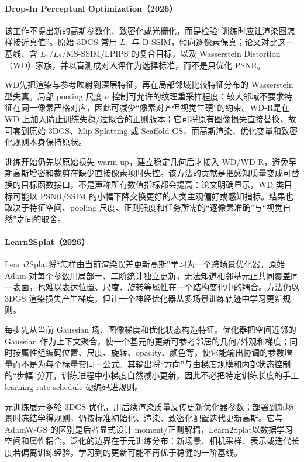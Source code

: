 \paragraph{Drop-In Perceptual Optimization（2026）\cite{2603_23297}}
该工作不提出新的高斯参数化、致密化或光栅化，而是检验“训练时应让渲染图怎样接近真值”。原始 3DGS 常用 $L_1$ 与 D-SSIM，倾向逐像素保真；论文对比这一基线、含 $L_1/L_2/$MS-SSIM/LPIPS 的复合目标，以及 Wasserstein Distortion（WD）家族，并以盲测成对人评作为选择标准，而不是只优化 PSNR。

WD先把渲染与参考映射到深层特征，再在局部邻域比较特征分布的 Wasserstein 型失真。局部 pooling 尺度 $\sigma$ 控制可允许的纹理重采样程度：较大邻域不要求特征在同一像素严格对应，因此可减少“像素对齐但视觉生硬”的约束。WD-R是在 WD 上加入防止训练失稳/过拟合的正则版本；它可将原有图像损失直接替换，故可套到原始 3DGS、Mip-Splatting 或 Scaffold-GS，而高斯渲染、优化变量和致密化规则本身保持原状。

训练开始仍先以原始损失 warm-up，建立稳定几何后才接入 WD/WD-R，避免早期高斯增密和裁剪在缺少直接像素项时失控。该方法的贡献是把感知质量变成可替换的目标函数接口，不是声称所有数值指标都会提高：论文明确显示，WD 类目标可能以 PSNR/SSIM 的小幅下降交换更好的人类主观偏好或感知指标。结果也取决于特征空间、pooling 尺度、正则强度和任务所需的“逐像素准确”与“视觉自然”之间的取舍。

\paragraph{Learn2Splat（2026）\cite{2605_15760}}
Learn2Splat将“怎样由当前渲染误差更新高斯”学习为一个跨场景优化器。原始 Adam 对每个参数用局部一、二阶统计独立更新，无法知道相邻基元正共同覆盖同一表面，也难以表达位置、尺度、旋转等属性在一个结构变化中的耦合。方法仍以 3DGS 渲染损失产生梯度，但让一个神经优化器从多场景训练轨迹中学习更新规则。

每步先从当前 Gaussian 场、图像梯度和优化状态构造特征。优化器把空间近邻的 Gaussian 作为上下文聚合，使一个基元的更新可参考邻居的几何/外观和梯度；同时按属性组编码位置、尺度、旋转、opacity、颜色等，使它能输出协调的参数增量而不是为每个标量套同一公式。其输出将“方向”与由梯度规模和内部状态控制的“步幅”分开，训练进程中小梯度自然减小更新，因此不必把特定训练长度的手工 learning-rate schedule 硬编码进规则。

元训练展开多轮 3DGS 优化，用后续渲染质量反传更新优化器参数；部署到新场景时冻结学得规则，仍按标准初始化、渲染、致密化配置迭代更新高斯。它与 AdamW-GS 的区别是后者显式设计 moment/正则解耦，Learn2Splat以数据学习空间和属性耦合。泛化的边界在于元训练分布：新场景、相机采样、表示或迭代长度若偏离训练经验，学习到的更新可能不再优于稳健的一阶基线。

